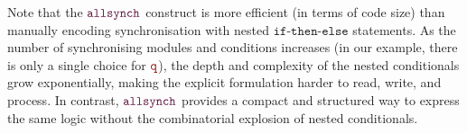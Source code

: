 \begin{itemize}
  Note that the $\allsynchName$ construct is more efficient (in terms
  of code size) than manually encoding synchronisation with nested
  $\mathtt{if\text{-}then\text{-}else}$ statements.  As the number of
  synchronising modules and conditions increases (in our example,
  there is only a single choice for $\nrr$), the depth and complexity
  of the nested conditionals grow exponentially, making the explicit
  formulation harder to read, write, and process.  In contrast,
  $\allsynchName$ provides a compact and structured way to express the
  same logic without the combinatorial explosion of nested
  conditionals.
\end{itemize}

  




